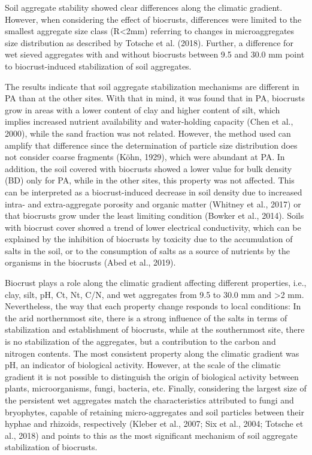 Soil aggregate stability showed clear differences along the climatic gradient. However, when considering the effect of biocrusts, differences were limited to the smallest aggregate size class (R<2mm) referring to changes in microaggregates size distribution as described by Totsche et al. (2018). Further, a difference for wet sieved aggregates with and without biocrusts between 9.5 and 30.0 mm point to biocrust-induced stabilization of soil aggregates.

The results indicate that soil aggregate stabilization mechanisms are different in PA than at the other sites. With that in mind, it was found that in PA, biocrusts grow in areas with a lower content of clay and higher content of silt, which implies increased nutrient availability and water-holding capacity (Chen et al., 2000), while the sand fraction was not related. However, the method used can amplify that difference since the determination of particle size distribution does not consider coarse fragments (Köhn, 1929), which were abundant at PA. In addition, the soil covered with biocrusts showed a lower value for bulk density (BD) only for PA, while in the other sites, this property was not affected. This can be interpreted as a biocrust-induced decrease in soil density due to increased intra- and extra-aggregate porosity and organic matter (Whitney et al., 2017) or that biocrusts grow under the least limiting condition (Bowker et al., 2014). Soils with biocrust cover showed a trend of lower electrical conductivity, which can be explained by the inhibition of biocrusts by toxicity due to the accumulation of salts in the soil, or to the consumption of salts as a source of nutrients by the organisms in the biocrusts (Abed et al., 2019).

Biocrust plays a role along the climatic gradient affecting different properties, i.e., clay, silt, pH, Ct, Nt, C/N, and wet aggregates from 9.5 to 30.0 mm and >2 mm. Nevertheless, the way that each property change responds to local conditions: In the arid northernmost site, there is a strong influence of the salts in terms of stabilization and establishment of biocrusts, while at the southernmost site, there is no stabilization of the aggregates, but a contribution to the carbon and nitrogen contents. The most consistent property along the climatic gradient was pH, an indicator of biological activity. However, at the scale of the climatic gradient it is not possible to distinguish the origin of biological activity between plants, microorganisms, fungi, bacteria, etc. Finally, considering the largest size of the persistent wet aggregates match the characteristics attributed to fungi and bryophytes, capable of retaining micro-aggregates and soil particles between their hyphae and rhizoids, respectively (Kleber et al., 2007; Six et al., 2004; Totsche et al., 2018) and points to this as the most significant mechanism of soil aggregate stabilization of biocrusts.

